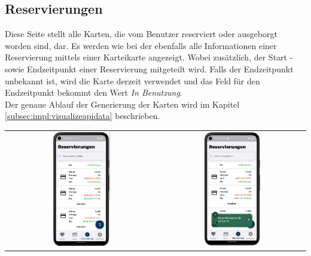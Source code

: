 \newpage
\subsection{Reservierungen}
Diese Seite stellt alle Karten, die vom Benutzer reserviert oder ausgeborgt worden sind, dar. Es werden wie bei der  ebenfalls alle Informationen einer Reservierung mittels einer Karteikarte angezeigt. Wobei zusätzlich, der Start -sowie Endzeitpunkt einer Reservierung mitgeteilt wird. Falls der Endzeitpunkt unbekannt ist, wird die Karte derzeit verwendet und das Feld für den Endzeitpunkt bekommt den Wert {\textit{In Benutzung}}.\\
Der genaue Ablauf der Generierung der Karten wird im Kapitel \ref{subsec:impl:visualizeapidata} beschrieben.

\begin{table}[htbp]
  \centering
  \begin{tabular}{cc}
    \includegraphics[width=0.4\textwidth]{FLUTTER/images/GP/Client_Reservation_Site.png}&
    \includegraphics[width=0.4\textwidth]{FLUTTER/images/GP/Client_Reservation_Site_Delete.png} \\

\end{tabular}
\end{table}
